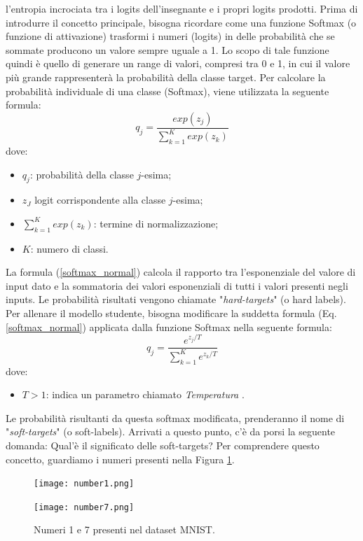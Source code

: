 l'entropia incrociata tra i logits dell'insegnante e i propri logits prodotti. 
Prima di introdurre il concetto principale, bisogna ricordare come una 
funzione Softmax (o funzione di attivazione) trasformi i numeri (logits) in 
delle probabilità che se sommate producono un valore sempre uguale a 1.  
Lo scopo di tale funzione quindi è quello di generare un range di valori, 
compresi tra 0 e 1, in cui il valore più grande rappresenterà la probabilità 
della classe target. Per calcolare la probabilità individuale di una classe 
(Softmax), viene utilizzata la seguente formula:
\begin{equation}\label{softmax_normal}
    q_j = \frac{exp(z_j)}{\sum_{k=1}^K exp(z_k)}
\end{equation}
dove:
\begin{itemize}
    \item $q_j$: probabilità della classe $j$-esima;
    \item $z_J$ logit corrispondente alla classe $j$-esima;
    \item $\sum_{k=1}^K exp(z_k)$: termine di normalizzazione;
    \item $K$: numero di classi.
\end{itemize}
La formula (\ref{softmax_normal}) calcola il rapporto tra l'esponenziale del valore di input 
dato e la sommatoria dei valori esponenziali di tutti i valori presenti negli 
inputs. Le probabilità risultati vengono chiamate "\emph{hard-targets}" (o hard 
labels). Per allenare il modello studente, bisogna modificare la suddetta 
formula (Eq. \ref{softmax_normal}) applicata dalla funzione Softmax nella seguente formula:
\begin{equation}
    q_j = \frac{e^{z_j/T}}{\sum_{k=1}^K e^{z_k/T}}
\end{equation}
dove:
\begin{itemize}
    \item $T>1$: indica un parametro chiamato \emph{Temperatura} \cite{marino2021compact}.
\end{itemize}
Le probabilità risultanti da questa softmax modificata, prenderanno il nome 
di "\emph{soft-targets}" (o soft-labels). Arrivati a questo punto, c'è da porsi la 
seguente domanda: Qual'è il significato delle soft-targets? Per comprendere 
questo concetto, guardiamo i numeri presenti nella Figura \ref{numbers_Mnist}.
\begin{figure}[]
    \begin{minipage}[t]{.45\textwidth}
        \centering
        \texttt{[image: number1.png]}
    \end{minipage}
    \hfill
    \begin{minipage}[t]{.45\textwidth}
        \centering
        \texttt{[image: number7.png]}
    \end{minipage}  
    \caption{Numeri 1 e 7 presenti nel dataset MNIST.}
    \label{numbers_Mnist}
\end{figure}
